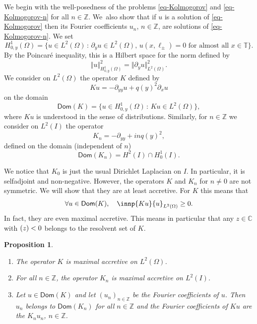\documentclass[10pt]{amsart}
\theoremstyle{plain}
\newtheorem{proposition}[theorem]{Proposition}
\theoremstyle{definition}
\newcommand{\nr}[1]{\Vert #1\Vert}
\newcommand{\set}[1]{\{ #1\}}
\newcommand{\1}{\mathds 1}
\newcommand{\st}{\,:\,}
\let\Re\relax
\DeclareMathOperator{\Re}{\mathsf{Re}\mkern2mu}
\newcommand{\Dom}{\mathsf{Dom}}
\def\C{\mathbb{C}}
\newcommand{\Z}{\mathbb{Z}}
\newcommand{\T}{\mathbb{T}}
\let\O\Omega
\begin{document}
We begin with the well-posedness of the problems \eqref{eq-Kolmogorov} and \eqref{eq-Kolmogorov-n} for all $n \in \Z$. We~also show that if $u$ is a solution of \eqref{eq-Kolmogorov} then its Fourier coefficients $u_n$, $n\in\Z$, are solutions of \eqref{eq-Kolmogorov-n}. We set
\[
H^1_{0,y}(\O) = \bigl\{u \in L^2(\O) \st \partial_y u \in L^2(\O),\, u(x ,\ell_\pm) = 0 \text{ for almost all } x \in \T \bigr\}.
\]
By the Poincaré inequality, this is a Hilbert space for the norm defined by
\[
\nr{u}_{H^1_{0,y}(\O)}^2 = \nr{\partial_y u}_{L^2(\O)}^2.
\]
We consider on $L^2(\O)$ the operator $K$ defined by
\[
Ku = -\partial_{yy} u + q(y)^2 \partial_x u
\]
on the domain
\[
\Dom(K) = \set{u \in H^1_{0,y}(\O) \st K u \in L^2(\O)},
\]
where $Ku$ is understood in the sense of distributions. Similarly, for $n \in \Z$ we consider on $L^2(I)$ the operator
\begin{equation} \label{def-Kn}
K_n = -\partial_{yy} + i n q(y)^2,
\end{equation}
defined on the domain (independent of $n$)
\begin{equation} \label{dom-Kn}
\Dom(K_n) = H^2(I) \cap H_0^1(I).
\end{equation}

We notice that $K_0$ is just the usual Dirichlet Laplacian on $I$. In particular, it is selfadjoint and non-negative. However, the operators $K$ and $K_n$ for $n \neq 0$ are not symmetric. We will show that they are at least accretive. For $K$ this means that
\[
\forall u \in \Dom(K), \quad \Re \innp{K u}{u}_{L^2(\O)} \geq 0.
\]
In fact, they are even maximal accretive. This means in particular that any $z \in \C$ with $\Re(z) < 0$ belongs to the resolvent set of $K$.

\skpt
\begin{proposition}
\begin{enumerate}
\item The operator $K$ is maximal accretive on $L^2(\O)$.
\item For all $n \in \Z$, the operator $K_n$ is maximal accretive on $L^2(I)$.
\item Let $u \in \Dom(K)$ and let $(u_n)_{n \in \Z}$ be the Fourier coefficients of $u$. Then $u_n$ belongs to $\Dom(K_n)$ for all $n \in \Z$ and the Fourier coefficients of $Ku$ are the $K_n u_n$, $n \in \Z$.
\end{enumerate}
\label{prop-K-Kn}
\end{proposition}
\end{document}
